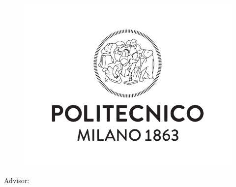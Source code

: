 \begin{titlepage}
    \begin{center}
    	\Large
    	\spacedlowsmallcaps{\myUni} \\
    	\large
        \bigskip\myFaculty \\
        \medskip\mySchool \\
    	\medskip\myDepartment \\
    	\bigskip\myCourseFirstPart \\
        \medskip\myCourseSecondPart \\

        \hfill

        \vfill

        \begin{figure}[!h]
			\begin{center}
				\includegraphics[width=0.4\columnwidth]{Images/logoPoli.pdf}
			\end{center}
		\end{figure}

		\vfill

        \begingroup
       		\LARGE
            \myTitle
            \bigskip
        \endgroup

        \vfill

		\flushleft
		\normalsize{Advisor:}
		\medskip\spacedlowsmallcaps{\mySupervisor}



\end{center}
\end{titlepage}
